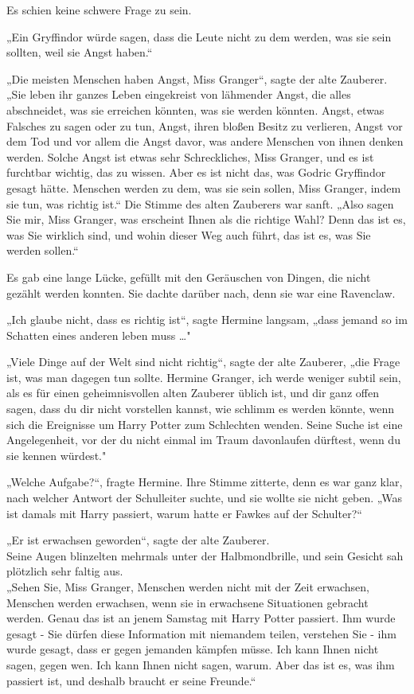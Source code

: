 {Es schien keine schwere Frage zu sein.

„Ein Gryffindor würde sagen, dass die Leute nicht zu dem werden, was sie sein sollten, weil sie Angst haben.“

„Die meisten Menschen haben Angst, Miss Granger“, sagte der alte Zauberer. „Sie leben ihr ganzes Leben eingekreist von lähmender Angst, die alles abschneidet, was sie erreichen könnten, was sie werden könnten. Angst, etwas Falsches zu sagen oder zu tun, Angst, ihren bloßen Besitz zu verlieren, Angst vor dem Tod und vor allem die Angst davor, was andere Menschen von ihnen denken werden. Solche Angst ist etwas sehr Schreckliches, Miss Granger, und es ist furchtbar wichtig, das zu wissen. Aber es ist nicht das, was Godric Gryffindor gesagt hätte. Menschen werden zu dem, was sie sein sollen, Miss Granger, indem sie tun, was richtig ist.“ Die Stimme des alten Zauberers war sanft. „Also sagen Sie mir, Miss Granger, was erscheint Ihnen als die richtige Wahl? Denn das ist es, was Sie wirklich sind, und wohin dieser Weg auch führt, das ist es, was Sie werden sollen.“

Es gab eine lange Lücke, gefüllt mit den Geräuschen von Dingen, die nicht gezählt werden konnten. Sie dachte darüber nach, denn sie war eine Ravenclaw.

„Ich glaube nicht, dass es richtig ist“, sagte Hermine langsam, „dass jemand so im Schatten eines anderen leben muss …"

„Viele Dinge auf der Welt sind nicht richtig“, sagte der alte Zauberer, „die Frage ist, was man dagegen tun sollte. Hermine Granger, ich werde weniger subtil sein, als es für einen geheimnisvollen alten Zauberer üblich ist, und dir ganz offen sagen, dass du dir nicht vorstellen kannst, wie schlimm es werden könnte, wenn sich die Ereignisse um Harry Potter zum Schlechten wenden. Seine Suche ist eine Angelegenheit, vor der du nicht einmal im Traum davonlaufen dürftest, wenn du sie kennen würdest."

„Welche Aufgabe?“, fragte Hermine. Ihre Stimme zitterte, denn es war ganz klar, nach welcher Antwort der Schulleiter suchte, und sie wollte sie nicht geben. „Was ist damals mit Harry passiert, warum hatte er Fawkes auf der Schulter?“

„Er ist erwachsen geworden“, sagte der alte Zauberer.\\ Seine Augen blinzelten mehrmals unter der Halbmondbrille, und sein Gesicht sah plötzlich sehr faltig aus.\\ „Sehen Sie, Miss Granger, Menschen werden nicht mit der Zeit erwachsen, Menschen werden erwachsen, wenn sie in erwachsene Situationen gebracht werden. Genau das ist an jenem Samstag mit Harry Potter passiert. Ihm wurde gesagt - Sie dürfen diese Information mit niemandem teilen, verstehen Sie - ihm wurde gesagt, dass er gegen jemanden kämpfen müsse. Ich kann Ihnen nicht sagen, gegen wen. Ich kann Ihnen nicht sagen, warum. Aber das ist es, was ihm passiert ist, und deshalb braucht er seine Freunde.“

}
